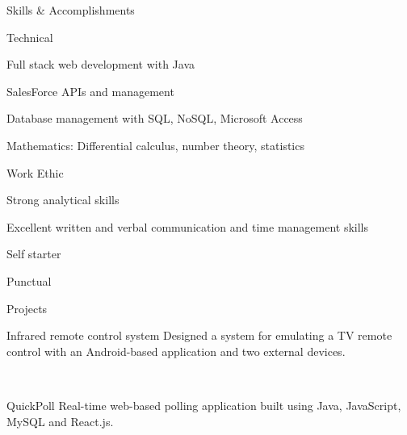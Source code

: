 \documentclass{resume} %
\begin{document}

\begin{rSection}{Skills \& Accomplishments}
	\begin{rSubQualificationsSection}{Technical}
		\item Full stack web development with Java
		\item SalesForce APIs and management
		\item Database management with SQL, NoSQL, Microsoft Access
		\item Mathematics: Differential calculus, number theory, statistics	
	\end{rSubQualificationsSection}

	\begin{rSubQualificationsSection}{Work Ethic}
		\item Strong analytical skills
		\item Excellent written and verbal communication and time management skills
		\item Self starter
		\item Punctual
	\end{rSubQualificationsSection}
	

	\begin{rSubsection}{Projects}
		\begin{rProject}{Infrared remote control system}
			Designed a system for emulating a TV remote control with an Android-based application and two external devices. 
		\end{rProject}
	\\
		\begin{rProject}{QuickPoll}
			Real-time web-based polling application built using Java, JavaScript, MySQL and React.js.
		\end{rProject}
	\end{rSubsection}
\end{rSection}
\end{document}

